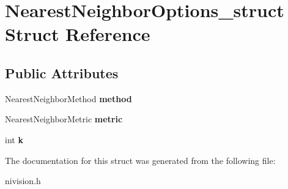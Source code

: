 \hypertarget{structNearestNeighborOptions__struct}{\section{\-Nearest\-Neighbor\-Options\-\_\-struct \-Struct \-Reference}
\label{structNearestNeighborOptions__struct}
}
\subsection*{\-Public \-Attributes}
\begin{DoxyCompactItemize}
\item 
\hypertarget{structNearestNeighborOptions__struct_a80dcc83d63450744d49273865cc53ff0}{\-Nearest\-Neighbor\-Method {\bfseries method}}\label{structNearestNeighborOptions__struct_a80dcc83d63450744d49273865cc53ff0}

\item 
\hypertarget{structNearestNeighborOptions__struct_a54fe91388604fa6ac06c5da8418f3cab}{\-Nearest\-Neighbor\-Metric {\bfseries metric}}\label{structNearestNeighborOptions__struct_a54fe91388604fa6ac06c5da8418f3cab}

\item 
\hypertarget{structNearestNeighborOptions__struct_a03901f745fe1d29b8db42fb3514525f3}{int {\bfseries k}}\label{structNearestNeighborOptions__struct_a03901f745fe1d29b8db42fb3514525f3}

\end{DoxyCompactItemize}


\-The documentation for this struct was generated from the following file\-:\begin{DoxyCompactItemize}
\item 
nivision.\-h\end{DoxyCompactItemize}
